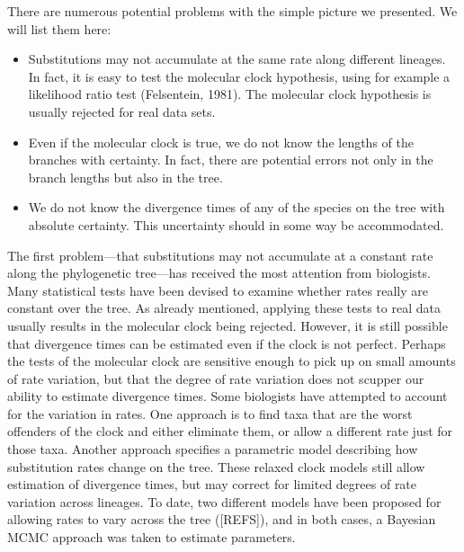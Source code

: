 \documentclass{svmult}
\begin{document}
There are numerous potential problems with the simple picture we presented. We will list them here:
\begin{itemize}
\item Substitutions may not accumulate at the same rate along different lineages. In fact, it is
easy to test the molecular clock hypothesis, using for example a likelihood ratio test
(Felsentein, 1981). The molecular clock hypothesis is usually rejected for real data sets. 

\item Even if the molecular clock is true, we do not know the lengths of the branches with
certainty. In fact, there are potential errors not only in the branch lengths but also in the
tree.

\item We do not know the divergence times of any of the species on the tree with absolute certainty.
This uncertainty should in some way be accommodated.
\end{itemize}

The first problem---that substitutions may not accumulate at a constant rate along the phylogenetic
tree---has received the most attention from biologists.  Many statistical tests have been devised
to examine whether rates really are constant over the tree. As already mentioned, applying these
tests to real data usually results in the molecular clock being rejected. However, it is still
possible that divergence times can be estimated even if the clock is not perfect. Perhaps the tests
of the molecular clock are sensitive enough to pick up on small amounts of rate variation, but that
the degree of rate variation does not scupper our ability to estimate divergence times.  Some
biologists have attempted to account for the variation in rates. One approach is to find taxa that
are the worst offenders of the clock and either eliminate them, or allow a different rate just for
those taxa. Another approach specifies a parametric model describing how substitution rates change
on the tree. These relaxed clock models still allow estimation of divergence times, but may correct
for limited degrees of rate variation across lineages. To date, two different models have been
proposed for allowing rates to vary across the tree ([REFS]), and in both cases, a Bayesian MCMC
approach was taken to estimate parameters.
\end{document}
